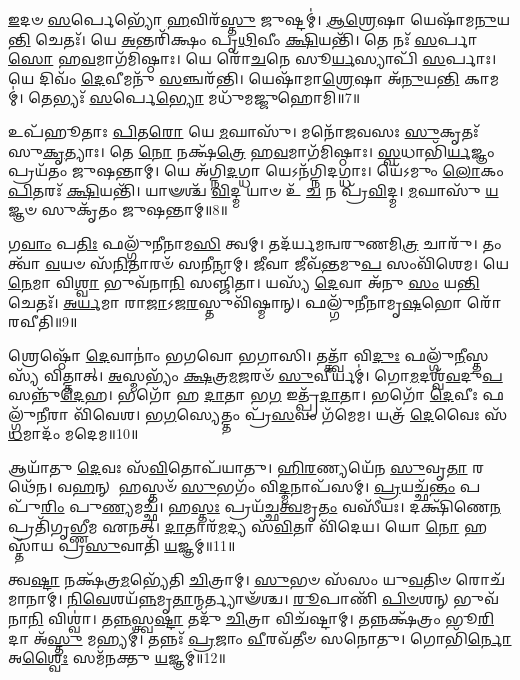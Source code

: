 \-\ul{𑌇}\-𑌦𑍞 \ul{𑌸}\-𑌰𑍍𑌪𑍇𑌭𑍍𑌯𑍋᳴ \ul{𑌹}\-𑌵𑌿𑌰᳴\-\ul{𑌸𑍍𑌤𑍁} 𑌜𑍁𑌷𑍍𑌟𑌮𑍍॑।
\-\ul{𑌆}\-\-\ul{𑌶𑍍𑌰𑍇}\-𑌷𑌾 𑌯𑍇𑌷𑌾᳴𑌮\-\ul{𑌨𑍁}\-𑌯\-\ul{𑌨𑍍𑌤𑌿} 𑌚𑍇𑌤𑌃᳴।
𑌯𑍇 \ul{𑌅}\-𑌨𑍍𑌤𑌰𑌿᳴𑌕𑍍𑌷𑌂 𑌪𑍃\-\ul{𑌥𑌿}\-𑌵𑍀𑌂 \ul{𑌕𑍍𑌷𑌿}\-𑌯𑌨𑍍𑌤𑌿᳴।
𑌤𑍇 𑌨𑌃᳴ \ul{𑌸}\-𑌰𑍍𑌪𑌾\-\ul{𑌸𑍋} 𑌹\-\ul{𑌵}\-𑌮𑌾𑌗᳴𑌮𑌿𑌷𑍍𑌠𑌾𑌃।
𑌯𑍇 𑌰𑍋᳴\-\ul{𑌚}\-𑌨𑍇 𑌸𑍂\-\ul{𑌰𑍍𑌯}\-𑌸𑍍𑌯𑌾𑌪𑌿᳴ \ul{𑌸}\-𑌰𑍍𑌪𑌾𑌃।
𑌯𑍇 𑌦𑌿𑌵𑌂᳴ \ul{𑌦𑍇}\-𑌵𑍀𑌮𑌨𑍁᳴ \ul{𑌸}\-𑌞𑍍𑌚𑌰᳴𑌨𑍍𑌤𑌿।
𑌯𑍇𑌷𑌾᳴𑌮𑌾\-\ul{𑌶𑍍𑌰𑍇}\-𑌷𑌾 𑌅᳴\-\ul{𑌨𑍁}\-𑌯\-\ul{𑌨𑍍𑌤𑌿} 𑌕𑌾𑌮𑌮𑍍॑।
𑌤𑍇𑌭𑍍𑌯𑌃᳴ \ul{𑌸}\-𑌰𑍍𑌪𑍇\-\ul{𑌭𑍍𑌯𑍋} 𑌮𑌧𑍁᳴𑌮𑌜𑍍𑌜𑍁𑌹𑍋𑌮𑌿॥7॥ 

𑌉𑌪᳴𑌹𑍂𑌤𑌾𑌃 \ul{𑌪𑌿}\-𑌤\-\ul{𑌰𑍋} 𑌯𑍇 \ul{𑌮}\-𑌘𑌾𑌸𑍁᳴।
𑌮𑌨𑍋᳴𑌜𑌵𑌸𑌃 \ul{𑌸𑍁}\-𑌕𑍃𑌤𑌃᳴ 𑌸𑍁\-\ul{𑌕𑍃}\-𑌤𑍍𑌯𑌾𑌃।
𑌤𑍇 \ul{𑌨𑍋} 𑌨𑌕𑍍𑌷᳴\-\ul{𑌤𑍍𑌰𑍇} 𑌹\-\ul{𑌵}\-𑌮𑌾𑌗᳴𑌮𑌿𑌷𑍍𑌠𑌾𑌃।
\-\ul{𑌸𑍍𑌵}\-𑌧𑌾𑌭𑌿᳴\-\ul{𑌰𑍍𑌯}\-𑌜𑍍𑌞𑌂 𑌪𑍍𑌰𑌯᳴𑌤𑌂 𑌜𑍁𑌷𑌨𑍍𑌤𑌾𑌮𑍍।
𑌯𑍇 𑌅᳴𑌗𑍍𑌨𑌿\-\ul{𑌦}\-𑌗𑍍𑌧𑌾 𑌯𑍇𑌽𑌨᳴𑌗𑍍𑌨𑌿𑌦𑌗𑍍𑌧𑌾𑌃।
𑌯𑍇᳴𑌽𑌮𑍁𑌂 \ul{𑌲𑍋}\-𑌕𑌂 \ul{𑌪𑌿}\-𑌤𑌰𑌃᳴ \ul{𑌕𑍍𑌷𑌿}\-𑌯𑌨𑍍𑌤𑌿᳴।
𑌯𑌾𑍟𑌶𑍍𑌚᳴ \ul{𑌵𑌿}\-𑌦𑍍𑌮 𑌯𑌾𑍞 𑌉᳴ \ul{𑌚} 𑌨 𑌪𑍍𑌰᳴\-\ul{𑌵𑌿}\-𑌦𑍍𑌮।
\-\ul{𑌮}\-𑌘𑌾𑌸𑍁᳴ \ul{𑌯}\-𑌜𑍍𑌞𑍞 𑌸𑍁𑌕𑍃᳴𑌤𑌂 𑌜𑍁𑌷𑌨𑍍𑌤𑌾𑌮𑍍॥8॥ 

𑌗\-\ul{𑌵𑌾𑌂} 𑌪\-\ul{𑌤𑌿𑌃} 𑌫𑌲𑍍𑌗𑍁᳴𑌨𑍀𑌨𑌾𑌮\-\ul{𑌸𑌿} 𑌤𑍍𑌵𑌮𑍍।
𑌤𑌦᳴𑌰𑍍𑌯𑌮𑌨𑍍𑌵𑌰𑍁𑌣𑌮𑌿\-\ul{𑌤𑍍𑌰} 𑌚𑌾𑌰𑍁᳴।
𑌤𑌂 𑌤𑍍𑌵𑌾᳴ \ul{𑌵}\-𑌯𑍞 𑌸᳴\-\ul{𑌨𑌿}\-𑌤𑌾𑌰𑍞᳴ 𑌸\-\ul{𑌨𑍀}\-𑌨𑌾𑌮𑍍।
\-\ul{𑌜𑍀}\-𑌵𑌾 𑌜𑍀𑌵᳴\-\ul{𑌨𑍍𑌤}\-𑌮𑍁\-\ul{𑌪} 𑌸𑌂𑌵𑌿᳴𑌶𑍇𑌮।
𑌯𑍇\-\ul{𑌨𑍇}\-𑌮𑌾 𑌵𑌿\-\ul{𑌶𑍍𑌵𑌾} 𑌭𑍁𑌵᳴𑌨𑌾\-\ul{𑌨𑌿} 𑌸𑌞𑍍𑌜𑌿᳴𑌤𑌾।
𑌯𑌸𑍍𑌯᳴ \ul{𑌦𑍇}\-𑌵𑌾 𑌅᳴𑌨𑍁 \ul{𑌸𑌂} 𑌯\-\ul{𑌨𑍍𑌤𑌿} 𑌚𑍇𑌤𑌃᳴।
\-\ul{𑌅}\-\-\ul{𑌰𑍍𑌯}\-𑌮𑌾 𑌰𑌾\-\ul{𑌜𑌾}\-\-𑌽𑌜\-\ul{𑌰}\-𑌸𑍍𑌤𑍁𑌵𑌿᳴𑌷𑍍𑌮𑌾𑌨𑍍।
𑌫𑌲𑍍𑌗𑍁᳴𑌨𑍀𑌨𑌾𑌮𑍃\-\ul{𑌷}\-𑌭𑍋 𑌰𑍋᳴𑌰𑌵𑍀𑌤𑌿॥9॥ 

𑌶𑍍𑌰𑍇𑌷𑍍𑌠𑍋᳴ \ul{𑌦𑍇}\-𑌵𑌾𑌨𑌾𑌂॑ 𑌭𑌗𑌵𑍋 𑌭𑌗𑌾𑌸𑌿।
𑌤𑌤𑍍𑌤𑍍𑌵𑌾᳴ 𑌵𑌿\-\ul{𑌦𑍁𑌃} 𑌫𑌲𑍍𑌗𑍁᳴\-\ul{𑌨𑍀}\-𑌸𑍍𑌤𑌸𑍍𑌯᳴ 𑌵𑌿𑌤𑍍𑌤𑌾𑌤𑍍।
\-\ul{𑌅}\-𑌸𑍍𑌮𑌭𑍍𑌯𑌂᳴ \ul{𑌕𑍍𑌷}\-𑌤𑍍𑌰\-\ul{𑌮}\-𑌜𑌰𑍞᳴ \ul{𑌸𑍁}\-𑌵𑍀𑌰𑍍𑌯𑌮𑍍॑।
𑌗𑍋\-\ul{𑌮}\-𑌦𑌶𑍍𑌵᳴\-\ul{𑌵}\-𑌦𑍁\-\ul{𑌪} 𑌸𑌨𑍍𑌨𑍁᳴\-\-\ul{𑌦𑍇}\-𑌹।
𑌭𑌗𑍋᳴ 𑌹 \ul{𑌦𑌾}\-𑌤𑌾 𑌭\-\ul{𑌗} 𑌇𑌤𑍍𑌪𑍍𑌰᳴\-\ul{𑌦𑌾}\-𑌤𑌾।
𑌭𑌗𑍋᳴ \ul{𑌦𑍇}\-𑌵𑍀𑌃 𑌫𑌲𑍍𑌗𑍁᳴\-\ul{𑌨𑍀}\-𑌰𑌾 𑌵𑌿᳴𑌵𑍇𑌶।
𑌭\-\ul{𑌗}\-𑌸𑍍𑌯𑍇𑌤𑍍𑌤𑌂 𑌪𑍍𑌰᳴\-\ul{𑌸}\-𑌵𑌂 𑌗᳴𑌮𑍇𑌮।
𑌯𑌤𑍍𑌰᳴ \ul{𑌦𑍇}\-𑌵𑍈𑌃 𑌸᳴\-\ul{𑌧}\-𑌮𑌾𑌦𑌂᳴ 𑌮𑌦𑍇𑌮॥10॥ 

𑌆𑌯𑌾᳴𑌤𑍁 \ul{𑌦𑍇}\-𑌵𑌃 𑌸᳴\-\ul{𑌵𑌿}\-𑌤𑍋𑌪᳴𑌯𑌾𑌤𑍁।
\-\ul{𑌹𑌿}\-\-\ul{𑌰}\-𑌣𑍍𑌯𑌯𑍇᳴𑌨 \ul{𑌸𑍁}\-𑌵𑍃\-\ul{𑌤𑌾} 𑌰𑌥𑍇᳴𑌨।
𑌵\-\ul{𑌹}\-𑌨𑍍 𑌹𑌸𑍍𑌤𑍞᳴ \ul{𑌸𑍁}\-𑌭𑌗𑌂᳴ 𑌵𑌿\-\ul{𑌦𑍍𑌮}\-𑌨𑌾𑌪᳴𑌸𑌮𑍍।
\-\ul{𑌪𑍍𑌰}\-𑌯𑌚𑍍𑌛᳴\-\ul{𑌨𑍍𑌤𑌂} 𑌪𑌪𑍁᳴\-\ul{𑌰𑌿𑌂} 𑌪𑍁\-\ul{𑌣𑍍𑌯}\-𑌮𑌚𑍍𑌛᳴।
𑌹\-\ul{𑌸𑍍𑌤𑌃} 𑌪𑍍𑌰𑌯᳴𑌚𑍍𑌛\-\ul{𑌤𑍍𑌵}\-𑌮𑍃\-\ul{𑌤𑌂} 𑌵𑌸𑍀᳴𑌯𑌃।
𑌦𑌕𑍍𑌷𑌿᳴𑌣𑍇\-\ul{𑌨} 𑌪𑍍𑌰𑌤𑌿᳴𑌗𑍃𑌭𑍍𑌣𑍀𑌮 𑌏𑌨𑌤𑍍।
\-\ul{𑌦𑌾}\-𑌤𑌾𑌰᳴\-\ul{𑌮}\-𑌦𑍍𑌯 𑌸᳴\-\ul{𑌵𑌿}\-𑌤𑌾 𑌵𑌿᳴𑌦𑍇𑌯।
𑌯𑍋 \ul{𑌨𑍋} 𑌹𑌸𑍍𑌤𑌾᳴𑌯 𑌪𑍍𑌰\-\ul{𑌸𑍁}\-𑌵𑌾𑌤𑌿᳴ \ul{𑌯}\-𑌜𑍍𑌞𑌮𑍍॥11॥ 

𑌤𑍍𑌵\-\ul{𑌷𑍍𑌟𑌾} 𑌨𑌕𑍍𑌷᳴𑌤𑍍𑌰\-\ul{𑌮}\-𑌭𑍍𑌯𑍇᳴𑌤𑌿 \ul{𑌚𑌿}\-𑌤𑍍𑌰𑌾𑌮𑍍।
\-\ul{𑌸𑍁}\-𑌭𑍞 𑌸᳴𑌸𑌂 𑌯𑍁\-\ul{𑌵}\-𑌤𑌿𑍞 𑌰𑍋𑌚᳴𑌮𑌾𑌨𑌾𑌮𑍍।
\-\ul{𑌨𑌿}\-\-\ul{𑌵𑍇}\-𑌶𑌯᳴\-\ul{𑌨𑍍𑌨}\-\-𑌮𑍃\-\ul{𑌤𑌾}\-𑌨𑍍𑌮𑌰𑍍𑌤𑍍𑌯𑌾𑍟᳴𑌶𑍍𑌚।
\-\ul{𑌰𑍂}\-𑌪𑌾𑌣𑌿᳴ \ul{𑌪𑌿}\-\-\ul{𑍞}\-𑌶𑌨𑍍 𑌭𑍁𑌵᳴𑌨𑌾\-\ul{𑌨𑌿} 𑌵𑌿𑌶𑍍𑌵𑌾॑।
𑌤\-\ul{𑌨𑍍𑌨}\-𑌸𑍍𑌤𑍍𑌵\-\ul{𑌷𑍍𑌟𑌾} 𑌤𑌦𑍁᳴ \ul{𑌚𑌿}\-𑌤𑍍𑌰𑌾 𑌵𑌿𑌚᳴𑌷𑍍𑌟𑌾𑌮𑍍।
𑌤𑌨𑍍𑌨𑌕𑍍𑌷᳴𑌤𑍍𑌰𑌂 𑌭𑍂\-\ul{𑌰𑌿}\-𑌦𑌾 𑌅᳴\-\ul{𑌸𑍍𑌤𑍁} 𑌮𑌹𑍍𑌯𑌮𑍍॑।
𑌤𑌨𑍍𑌨𑌃᳴ \ul{𑌪𑍍𑌰}\-𑌜𑌾𑌂 \ul{𑌵𑍀}\-𑌰𑌵᳴𑌤𑍀𑍞 𑌸𑌨𑍋𑌤𑍁।
𑌗𑍋𑌭𑌿᳴\-\ul{𑌰𑍍𑌨𑍋} 𑌅\-\ul{𑌶𑍍𑌵𑍈𑌃} 𑌸𑌮᳴𑌨𑌕𑍍𑌤𑍁 \ul{𑌯}\-𑌜𑍍𑌞𑌮𑍍॥12॥ 

